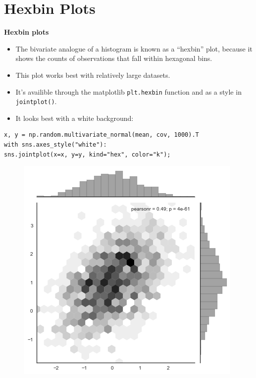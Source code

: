 \documentclass{beamer}
\begin{document}
\section{Hexbin Plots}
\begin{frame}[fragile]
\noindent \textbf{Hexbin plots}
\begin{itemize}
\item The bivariate analogue of a histogram is known as a “hexbin” plot, because it shows the counts of observations that fall within hexagonal bins. \item This plot works best with relatively large datasets. 
\item It’s availible through the matplotlib \texttt{plt.hexbin} function and as a style in \texttt{jointplot()}. 
\item It looks best with a white background:
\end{itemize}

\end{frame}
\begin{frame}[fragile]
\begin{verbatim}
x, y = np.random.multivariate_normal(mean, cov, 1000).T
with sns.axes_style("white"):
sns.jointplot(x=x, y=y, kind="hex", color="k");
\end{verbatim}

\begin{figure}
\centering
\includegraphics[width=0.7\linewidth]{images/distributions_32_0}

\end{figure}

\end{frame}
\end{document}

